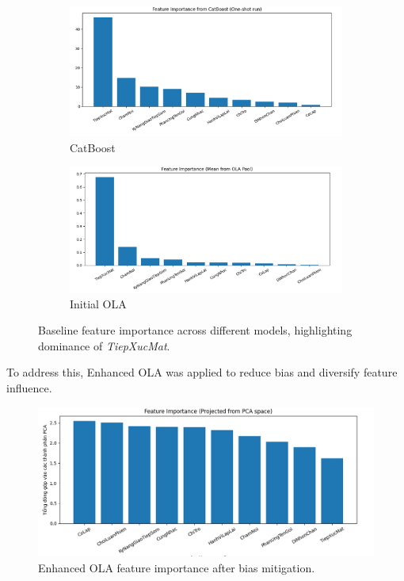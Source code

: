 \documentclass[conference]{IEEEtran}
\begin{document}
\begin{figure}[H]
    \begin{subfigure}[b]{0.45\linewidth}
        \includegraphics[width=\linewidth]{images/feature_cat.png}
        \caption{CatBoost}
        \label{fig:x3}
    \end{subfigure}
    \hfill
    \begin{subfigure}[b]{0.45\linewidth}
        \includegraphics[width=\linewidth]{images/feature_ola.png}
        \caption{Initial OLA}
        \label{fig:x4}
    \end{subfigure}

    \caption{Baseline feature importance across different models, highlighting dominance of \textit{TiepXucMat}.}
    \label{fig:baseline_features}
\end{figure}

To address this, Enhanced OLA was applied to reduce bias and diversify feature influence.

\begin{figure}[H]
    \centering
    \includegraphics[width=0.85\linewidth]{images/feature_enhanced_ola.png}
    \caption{Enhanced OLA feature importance after bias mitigation.}
    \label{fig:importance_after}
\end{figure}
\end{document}
